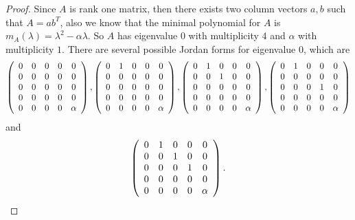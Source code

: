 \documentclass[11pt]{book}
\theoremstyle{definition}
\numberwithin{equation}{chapter}
\begin{document}
\begin{proof}
Since $A$ is rank one matrix, then there exists two column vectors $a,b$ such that $A=ab^T$, also we know that the minimal polynomial for $A$ is $m_A(\lambda) = \lambda^2 - \alpha \lambda$. So $A$ has eigenvalue $0$ with multiplicity $4$ and $\alpha$ with multiplicity $1$. There are several possible Jordan forms for eigenvalue $0$, which are
\begin{align*}
    \left(\begin{array}
    [c]{ccccc}%
    0 & 0 & 0 & 0 & 0\\
    0 & 0 & 0 & 0 & 0\\
    0 & 0 & 0 & 0 & 0\\
    0 & 0 & 0 & 0 & 0\\
    0 & 0 & 0 & 0 & \alpha
    \end{array}\right),
    \left(\begin{array}
    [c]{ccccc}%
    0 & 1 & 0 & 0 & 0\\
    0 & 0 & 0 & 0 & 0\\
    0 & 0 & 0 & 0 & 0\\
    0 & 0 & 0 & 0 & 0\\
    0 & 0 & 0 & 0 & \alpha
    \end{array}\right),
    \left(\begin{array}
    [c]{ccccc}%
    0 & 1 & 0 & 0 & 0\\
    0 & 0 & 1 & 0 & 0\\
    0 & 0 & 0 & 0 & 0\\
    0 & 0 & 0 & 0 & 0\\
    0 & 0 & 0 & 0 & \alpha
    \end{array}\right),
    \left(\begin{array}
    [c]{ccccc}%
    0 & 1 & 0 & 0 & 0\\
    0 & 0 & 0 & 0 & 0\\
    0 & 0 & 0 & 1 & 0\\
    0 & 0 & 0 & 0 & 0\\
    0 & 0 & 0 & 0 & \alpha
    \end{array}\right)
\end{align*}
and $$
    \left(\begin{array}
    [c]{ccccc}%
    0 & 1 & 0 & 0 & 0\\
    0 & 0 & 1 & 0 & 0\\
    0 & 0 & 0 & 1 & 0\\
    0 & 0 & 0 & 0 & 0\\
    0 & 0 & 0 & 0 & \alpha
    \end{array}\right).$$

\end{proof}
\end{document}
